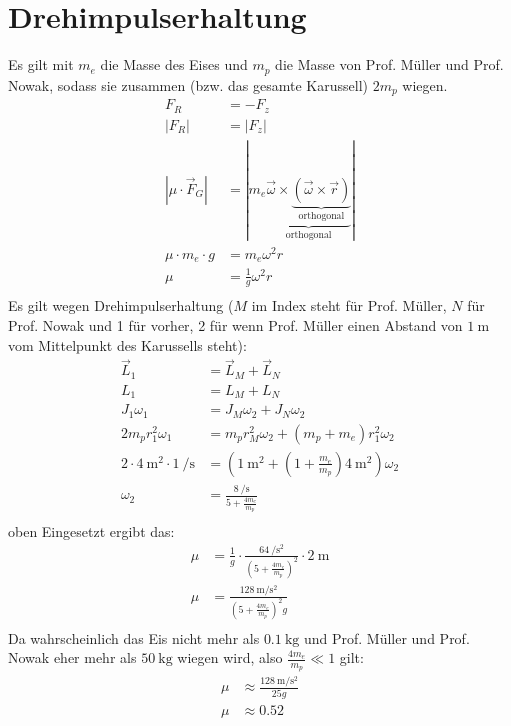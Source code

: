 \documentclass[sectionformat = aufgabe]{gadsescript}
\begin{document}
\maketitle
\setcounter{section}{1}
\section{Drehimpulserhaltung}
Es gilt mit $ m_e $ die Masse des Eises und $ m_p $ die Masse von Prof. Müller und Prof. Nowak, sodass sie zusammen (bzw. das gesamte Karussell) $ 2m_p $ wiegen.
\begin{align*}
	F_R &= -F_z\\
	\left| F_R \right| &= \left| F_z \right|  \\
	\left| \mu \cdot \vec F_G \right| &= | m_e \underbrace{\vec \omega \times \underbrace{\left(\vec \omega \times \vec r\right)}_{\text{orthogonal} }}_{\text{orthogonal} } |  \\
	\mu \cdot m_e \cdot g &= m_e \omega^2 r\\
	\mu &= \frac{ 1 }{ g } \omega^2 r \\
\end{align*}
Es gilt wegen Drehimpulserhaltung ($ M $ im Index steht für Prof. Müller, $ N $ für Prof. Nowak und 1 für vorher, 2 für wenn Prof. Müller einen Abstand von $ \qty{ 1 }{ \metre }  $ vom Mittelpunkt des Karussells steht):
\begin{align*}
	\vec L_1 &= \vec L_M + \vec L_N \\
	L_1 &= L_M + L_N \\
	J_1 \omega_1 &= J_M \omega_2 + J_N \omega_2\\
	2m_p r_1^2 \omega_1 &= m_p r_M^2 \omega_2 + (m_p + m_e) r_1^2 \omega_2 \\
	2 \cdot \qty{ 4 }{ \square\metre } \cdot \qty{ 1 }{ \per\second } &= \left( \qty{ 1 }{ \square\metre } + \left(1 + \frac{m_e}{ m_p }\right) \qty{ 4 }{ \square\metre } \right) \omega_2 \\
	\omega_2 &= \frac{ \qty{ 8 }{ \per\second }  }{ 5 + \frac{4m_e}{ m_p } } \\
\end{align*}
oben Eingesetzt ergibt das:
\begin{align*}
	\mu &= \frac{ 1 }{ g } \cdot \frac{ \qty{ 64 }{ \per\square\second } }{ \left(5 + \frac{4m_e}{ m_p } \right)^2 } \cdot \qty{ 2 }{ \metre } \\
	\mu &= \frac{ \qty{ 128 }{ \metre\per\square\second } }{ \left(5 + \frac{4m_e}{ m_p }\right)^2g } \\
\end{align*}
Da wahrscheinlich das Eis nicht mehr als $ \qty{ 0.1 }{ \kilogram }  $ und Prof. Müller und Prof. Nowak eher mehr als $ \qty{ 50 }{ \kilogram } $ wiegen wird, also $ \frac{4m_e}{ m_p } \ll 1 $ gilt:
\begin{align*}
	\mu &\approx \frac{ \qty{ 128 }{ \metre\per\square\second } }{ 25g } \\
	\mu &\approx 0.52
\end{align*}
\end{document}
